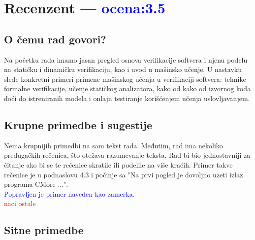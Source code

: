 \documentclass[a4paper]{report}
\newcommand{\odgovor}[1]{\textcolor{blue}{#1}}
\newcommand{\todo}[1]{\textcolor{red}{#1}}
\begin{document}
\chapter{Recenzent \odgovor{--- ocena:3.5} }


\section{O čemu rad govori?}

Na početku rada imamo jasan pregled osnova verifikacije softvera i njenu podelu na statičku i dinamičku verifikaciju, kao i uvod u mašinsko učenje. U nastavku slede konkretni primeri primene mašinskog učenja u verifikaciji softvera: tehnike formalne verifikacije, učenje statičkog analizatora, kako od kako od izvornog koda doći do istreniranih modela i onlajn testiranje korišćenjem učenja u\-slo\-vlja\-va\-njem.

\section{Krupne primedbe i sugestije}

Nema krupnijih primedbi na sam tekst rada. Međutim, rad ima nekoliko pre\-du\-ga\-čkih rečenica, što otežava razumevanje teksta. Rad bi bio jednostavniji za čitanje ako bi se te rečenice skratile ili podelile na više kraćih. Primer takve rečenice je u podnaslovu 4.3 i počinje sa "Na prvi pogled je dovoljno uzeti izlaz programa CMore ...".
\\\odgovor{ Popravljen je primer naveden kao zamerka.}
\\\todo{ naci ostale }

\section{Sitne primedbe}
\end{document}
